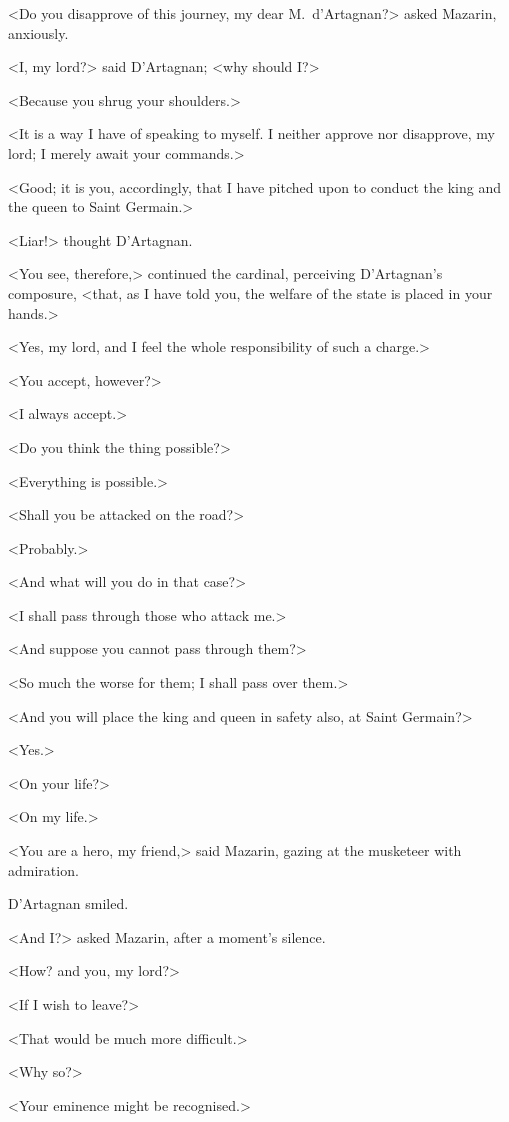 <Do you disapprove of this journey, my dear M.~d'Artagnan?> asked Mazarin, anxiously.

<I, my lord?> said D'Artagnan; <why should I?>

<Because you shrug your shoulders.>

<It is a way I have of speaking to myself. I neither approve nor disapprove, my lord; I merely await your commands.>

<Good; it is you, accordingly, that I have pitched upon to conduct the king and the queen to Saint Germain.>

<Liar!> thought D'Artagnan.

<You see, therefore,> continued the cardinal, perceiving D'Artagnan's composure, <that, as I have told you, the welfare of the state is placed in your hands.>

<Yes, my lord, and I feel the whole responsibility of such a charge.>

<You accept, however?>

<I always accept.>

<Do you think the thing possible?>

<Everything is possible.>

<Shall you be attacked on the road?>

<Probably.>

<And what will you do in that case?>

<I shall pass through those who attack me.>

<And suppose you cannot pass through them?>

<So much the worse for them; I shall pass over them.>

<And you will place the king and queen in safety also, at Saint Germain?>

<Yes.>

<On your life?>

<On my life.>

<You are a hero, my friend,> said Mazarin, gazing at the musketeer with admiration.

D'Artagnan smiled.

<And I?> asked Mazarin, after a moment's silence.

<How? and you, my lord?>

<If I wish to leave?>

<That would be much more difficult.>

<Why so?>

<Your eminence might be recognised.>

